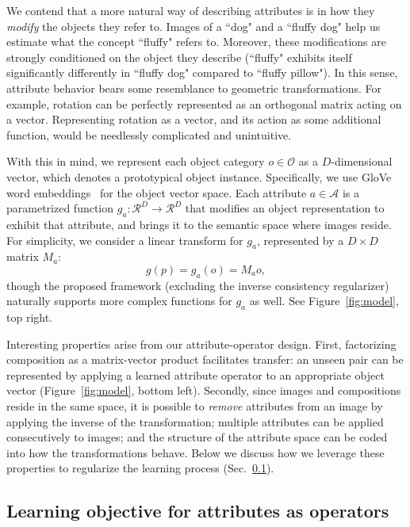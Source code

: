 \documentclass[runningheads]{llncs}
\begin{document}
We contend that a more natural way of describing attributes is in how they \emph{modify} the objects they refer to. Images of a ``dog" and a ``fluffy dog" help us estimate what the concept ``fluffy" refers to. Moreover, these modifications are strongly conditioned on the object they describe (``fluffy" exhibits itself significantly differently in ``fluffy dog" compared to ``fluffy pillow").
In this sense, attribute behavior bears some resemblance to geometric transformations.  For example, rotation can be perfectly represented as an orthogonal matrix acting on a vector. Representing rotation as a vector, and its action as some additional function, would be needlessly complicated and unintuitive. 

With this in mind, we represent each object category $o \in \mathcal{O}$ as a $D$-dimensional vector, which denotes a prototypical object instance. Specifically, we use GloVe word embeddings~\cite{pennington2014glove} for the object vector space.  Each attribute $a \in \mathcal{A}$ is a parametrized function $g_a: \mathcal{R}^{D} \rightarrow \mathcal{R}^{D}$ that modifies an object representation to exhibit that attribute, and brings it to the semantic space where images reside. For simplicity, we consider a linear transform for $g_a$, represented by a $D \times D$ matrix $M_a$:
\begin{equation}
g(p) = g_a(o) = M_a o,
\end{equation}
though the proposed framework (excluding the inverse consistency regularizer)  naturally supports more complex functions for $g_a$ as well. See Figure~\ref{fig:model}, top right. 

Interesting properties arise from our attribute-operator design.
First, factorizing composition as a matrix-vector product facilitates transfer: an unseen pair can be represented by applying a learned attribute operator to an appropriate object vector (Figure~\ref{fig:model}, bottom left).
Secondly, since images and compositions reside in the same space, it is possible to \emph{remove} attributes from an image by applying the inverse of the transformation; multiple attributes can be applied consecutively to images; and the structure of the attribute space can be coded into how the transformations behave. Below we discuss how we leverage these properties to regularize the learning process (Sec.~\ref{sec:loss_function}).

\subsection{Learning objective for attributes as operators} \label{sec:loss_function}
\end{document}

